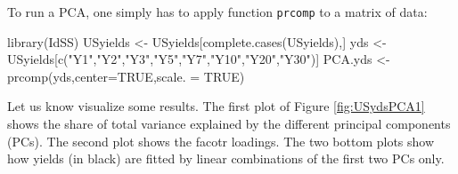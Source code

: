 \documentclass[
  12pt,
]{book}
\newenvironment{Shaded}{\begin{snugshade}}{\end{snugshade}}
\newcommand{\AttributeTok}[1]{\textcolor[rgb]{0.77,0.63,0.00}{#1}}
\newcommand{\ConstantTok}[1]{\textcolor[rgb]{0.00,0.00,0.00}{#1}}
\newcommand{\FunctionTok}[1]{\textcolor[rgb]{0.00,0.00,0.00}{#1}}
\newcommand{\NormalTok}[1]{#1}
\newcommand{\OtherTok}[1]{\textcolor[rgb]{0.56,0.35,0.01}{#1}}
\newcommand{\StringTok}[1]{\textcolor[rgb]{0.31,0.60,0.02}{#1}}
\theoremstyle{definition}
\theoremstyle{definition}
\theoremstyle{definition}
\theoremstyle{definition}
\theoremstyle{remark}
\begin{document}
To run a PCA, one simply has to apply function \texttt{prcomp} to a matrix of data:

\begin{Shaded}
\begin{Highlighting}[]
\FunctionTok{library}\NormalTok{(IdSS)}
\NormalTok{USyields }\OtherTok{\textless{}{-}}\NormalTok{ USyields[}\FunctionTok{complete.cases}\NormalTok{(USyields),]}
\NormalTok{yds }\OtherTok{\textless{}{-}}\NormalTok{ USyields[}\FunctionTok{c}\NormalTok{(}\StringTok{"Y1"}\NormalTok{,}\StringTok{"Y2"}\NormalTok{,}\StringTok{"Y3"}\NormalTok{,}\StringTok{"Y5"}\NormalTok{,}\StringTok{"Y7"}\NormalTok{,}\StringTok{"Y10"}\NormalTok{,}\StringTok{"Y20"}\NormalTok{,}\StringTok{"Y30"}\NormalTok{)]}
\NormalTok{PCA.yds }\OtherTok{\textless{}{-}} \FunctionTok{prcomp}\NormalTok{(yds,}\AttributeTok{center=}\ConstantTok{TRUE}\NormalTok{,}\AttributeTok{scale. =} \ConstantTok{TRUE}\NormalTok{)}
\end{Highlighting}
\end{Shaded}

Let us know visualize some results. The first plot of Figure \ref{fig:USydsPCA1} shows the share of total variance explained by the different principal components (PCs). The second plot shows the facotr loadings. The two bottom plots show how yields (in black) are fitted by linear combinations of the first two PCs only.
\end{document}
